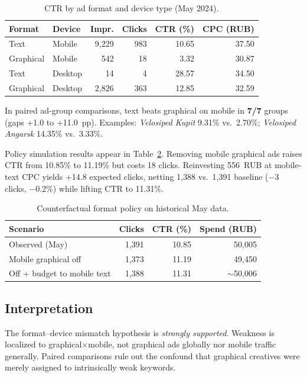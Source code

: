 \documentclass{article}
\begin{document}
\begin{table}[ht]
\centering
\caption{CTR by ad format and device type (May 2024).}
\label{tab:format}
\begin{tabular}{llrrrr}
\toprule
Format & Device & Impr. & Clicks & CTR (\%) & CPC (RUB) \\
\midrule
Text & Mobile & 9{,}229 & 983 & 10.65 & 37.50 \\
Graphical & Mobile & 542 & 18 & 3.32 & 30.87 \\
Text & Desktop & 14 & 4 & 28.57 & 34.50 \\
Graphical & Desktop & 2{,}826 & 363 & 12.85 & 32.59 \\
\bottomrule
\end{tabular}
\end{table}

In paired ad-group comparisons, text beats graphical on mobile in \textbf{7/7} groups (gaps +1.0 to +11.0~pp). Examples: \emph{Velosiped Kupit} 9.31\% vs.\ 2.70\%; \emph{Velosiped Angarsk} 14.35\% vs.\ 3.33\%.

Policy simulation results appear in Table~\ref{tab:policy}. Removing mobile graphical ads raises CTR from 10.85\% to 11.19\% but costs 18 clicks. Reinvesting 556~RUB at mobile-text CPC yields +14.8 expected clicks, netting 1{,}388 vs.\ 1{,}391 baseline ($-$3 clicks, $-$0.2\%) while lifting CTR to 11.31\%.

\begin{table}[ht]
\centering
\caption{Counterfactual format policy on historical May data.}
\label{tab:policy}
\begin{tabular}{lrrr}
\toprule
Scenario & Clicks & CTR (\%) & Spend (RUB) \\
\midrule
Observed (May) & 1{,}391 & 10.85 & 50{,}005 \\
Mobile graphical off & 1{,}373 & 11.19 & 49{,}450 \\
Off + budget to mobile text & 1{,}388 & 11.31 & $\sim$50{,}006 \\
\bottomrule
\end{tabular}
\end{table}

\subsection{Interpretation}

The format--device mismatch hypothesis is \emph{strongly supported}. Weakness is localized to graphical$\times$mobile, not graphical ads globally nor mobile traffic generally. Paired comparisons rule out the confound that graphical creatives were merely assigned to intrinsically weak keywords.
\end{document}
